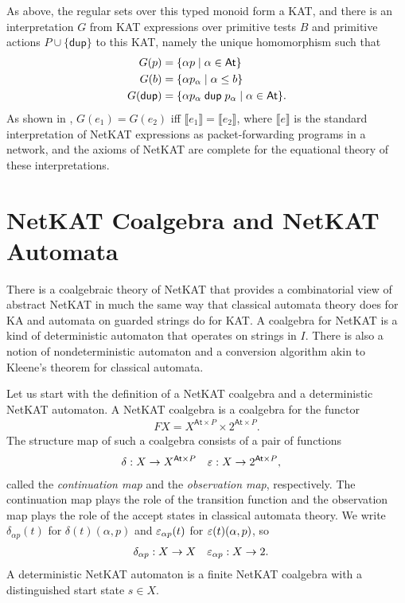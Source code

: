 \documentclass{article}
\newcommand\At{\ensuremath{\mathsf{At}}}
\newcommand{\netkat}{NetKAT\xspace}
\newcommand{\kw}[1]{\ensuremath{\mathsf{#1}}}
\newcommand{\pdup}{\ensuremath{\mathrel{\kw{dup}}}}
\newcommand{\den}[1]{\ensuremath{\llbracket #1\rrbracket}\xspace}
\begin{document}
As above, the regular sets over this typed monoid form a KAT, and there is an interpretation $G$ from KAT expressions over primitive tests $B$ and primitive actions $P\cup\{\pdup\}$ to this KAT, namely the unique homomorphism such that
\begin{align*}
G(p) &= \set{\alpha p}{\alpha\in\At}\\
G(b) &= \set{\alpha p_\alpha}{\alpha\leq b}\\
G(\pdup) &= \set{\alpha p_\alpha\pdup p_\alpha}{\alpha\in\At}.
\end{align*}
As shown in \cite{AFGJKSW13a}, $G(e_1)=G(e_2)$ iff $\den{e_1}=\den{e_2}$, where $\den{e}$ is the standard interpretation of \netkat expressions as packet-forwarding programs in a network, and the axioms of \netkat are complete for the equational theory of these interpretations.

\section{\netkat Coalgebra and \netkat Automata}

There is a coalgebraic theory of \netkat that provides a combinatorial view of abstract \netkat in much the same way that classical automata theory does for KA and automata on guarded strings do for KAT. A coalgebra for \netkat is a kind of deterministic automaton that operates on strings in $I$. There is also a notion of nondeterministic automaton and a conversion algorithm akin to Kleene's theorem for classical automata.

Let us start with the definition of a \netkat coalgebra and a deterministic \netkat automaton. A \netkat coalgebra is a coalgebra for the functor
\begin{align*}
FX = X^{\At\times P}\times 2^{\At\times P}.
\end{align*}
The structure map of such a coalgebra consists of a pair of functions
\begin{align*}
\delta &: X\to X^{\At\times P} & \eps &: X\to 2^{\At\times P},
\end{align*}
called the \emph{continuation map} and the \emph{observation map}, respectively. The continuation map plays the role of the transition function and the observation map plays the role of the accept states in classical automata theory. We write $\delta_{\alpha p}(t)$ for $\delta(t)(\alpha,p)$ and $\varepsilon_{\alpha p}(t)$ for $\varepsilon(t)(\alpha,p)$, so
\begin{align*}
\delta_{\alpha p} &: X\to X & \varepsilon_{\alpha p} &: X\to 2.
\end{align*}
A deterministic \netkat automaton is a finite \netkat coalgebra with a distinguished start state $s\in X$.
\end{document}
